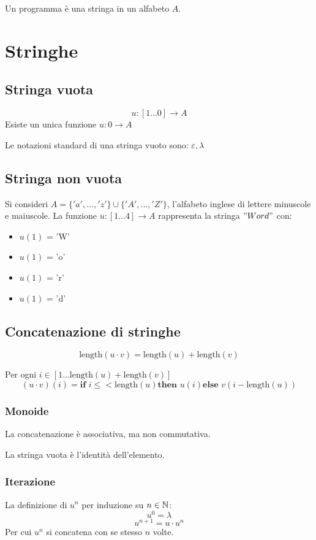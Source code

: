 \begin{theorem}
\begin{theorem}
  Un programma è una stringa in un alfabeto $A$.
\end{theorem}

\section{Stringhe}
\subsection{Stringa vuota}
\[u: [1\dots0] \rightarrow A\]
Esiste un unica funzione $u: 0\rightarrow A$

Le notazioni standard di una stringa vuoto sono: $\varepsilon, \lambda$

\subsection{Stringa non vuota}
Si consideri $A=\{'a',\dots,'z'\}\cup\{'A',\dots,'Z'\}$, l'alfabeto inglese
di lettere minuscole e maiuscole.
La funzione $u:[1\dots4]\rightarrow A$ rappresenta la stringa $"Word"$ con:
\begin{itemize}
  \item $u(1)$ = 'W'
  \item $u(1)$ = 'o'
  \item $u(1)$ = 'r'
  \item $u(1)$ = 'd'
\end{itemize}

\subsection{Concatenazione di stringhe}
\begin{theorem}
  \[\text{length}(u\cdot v) = \text{length}(u) + \text{length}(v)\]
  
  Per ogni $i\in[1\dots \text{length}(u) + \text{length}(v)]$
  \[ (u\cdot v)(i) = \textbf{if } i\leq<\text{length}(u) \textbf{then } u(i)
  \textbf{else } v(i-\text{length}(u))\]
\end{theorem}
\subsubsection{Monoide}
La concatenazione è associativa, ma non commutativa.

La stringa vuota è l'identità dell'elemento.
\subsubsection{Iterazione}
La definizione di $u^n$ per induzione su $n \in \mathbb{N}$:
\[u^0 = \lambda \]
\[u^{n+1} = u \cdot u^n\]
Per cui $u^n$ si concatena con se stesso $n$ volte.
\end{theorem}
